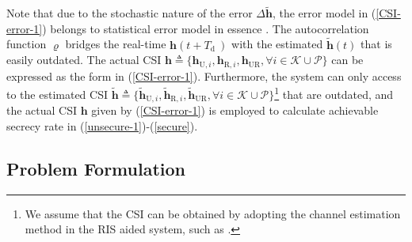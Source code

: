 \documentclass[12pt, draftclsnofoot, onecolumn]{IEEEtran}
\begin{document}
Note that due to the stochastic nature of the error $\Delta \tilde{\bm{h}}$, the error model in (\ref{CSI-error-1}) belongs to statistical error model in essence \cite{CSI-error-1,CSI-error-2}. The autocorrelation function $ \varrho $ bridges the real-time $ \bm{h}\left(t+T_{\text {d }}\right) $ with the estimated $\tilde{\bm{h}}(t)$ that is easily outdated. The actual CSI $ \bm{h} \triangleq \{ \bm{h}_{\mathrm{U}, i},\bm{h}_{\mathrm{R}, i},\bm{h}_{\mathrm{UR}}, \forall i \in \mathcal{K} \cup \mathcal{P}\} $ can be expressed as the form in (\ref{CSI-error-1}). Furthermore, the system can only access to the estimated CSI $ {\tilde{\bm{h}}} \triangleq \{ \tilde{\bm{h}}_{\mathrm{U}, i},\tilde{\bm{h}}_{\mathrm{R}, i},\tilde{\bm{h}}_{\mathrm{UR}}, \forall i \in \mathcal{K} \cup \mathcal{P} \} $\footnote{We assume that the CSI can be obtained by adopting the channel estimation method in the RIS aided system, such as \cite{footnote}.  } that are outdated, and the actual CSI $ \bm{h} $ given by (\ref{CSI-error-1}) is employed to calculate achievable secrecy rate in (\ref{unsecure-1})-(\ref{secure}).

\subsection{Problem Formulation}
\end{document}
